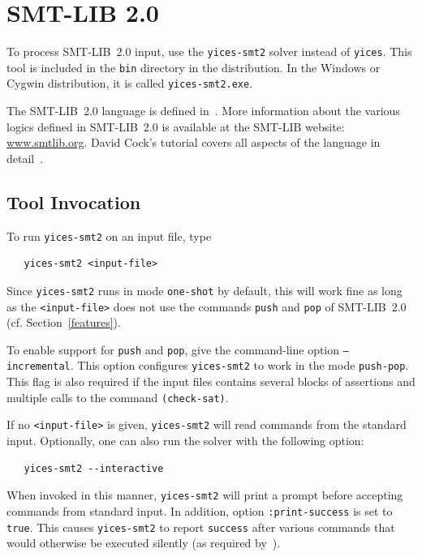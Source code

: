 \documentclass[11pt,twoside,fleqn,openright,titlepage]{cslreport}
\begin{document}
\section{SMT-LIB 2.0}

To process SMT-LIB~2.0 input, use the \texttt{yices-smt2} solver
instead of \texttt{yices}. This tool is included in the \texttt{bin}
directory in the distribution. In the Windows or Cygwin distribution,
it is called \texttt{yices-smt2.exe}.

\medskip\noindent
The SMT-LIB~2.0 language is defined in~\cite{SMTLIB20:2012}. More
information about the various logics defined in SMT-LIB~2.0 is
available at the SMT-LIB website: \url{www.smtlib.org}. David Cock's
tutorial covers all aspects of the language in
detail~\cite{SMTLIB:tutorial:2013}.


\subsection{Tool Invocation}

To run \texttt{yices-smt2} on an input file, type
\begin{small}
\begin{verbatim}
   yices-smt2 <input-file>
\end{verbatim}
\end{small}
Since \texttt{yices-smt2} runs in mode \texttt{one-shot} by default,
this will work fine as long as the \texttt{<input-file>} does not use
the commands \texttt{push} and \texttt{pop} of SMT-LIB~2.0
(cf. Section~\ref{features}).

\medskip\noindent To enable support for \texttt{push} and
\texttt{pop}, give the command-line option \texttt{--incremental}.
This option configures \texttt{yices-smt2} to work in the mode
\texttt{push-pop}. This flag is also required if the input files
contains several blocks of assertions and multiple calls to the
command \texttt{(check-sat)}.

\medskip\noindent If no \texttt{<input-file>} is given,
\texttt{yices-smt2} will read commands from the standard
input. Optionally, one can also run the solver with
the following option:
\begin{small}
\begin{verbatim}
   yices-smt2 --interactive
\end{verbatim}
\end{small}
When invoked in this manner, \texttt{yices-smt2} will print a prompt
before accepting commands from standard input. In addition, option
\texttt{:print-success} is set to \texttt{true}. This causes
\texttt{yices-smt2} to report \texttt{success} after various commands
that would otherwise be executed silently (as required
by~\cite{SMTLIB20:2012}).
\end{document}
